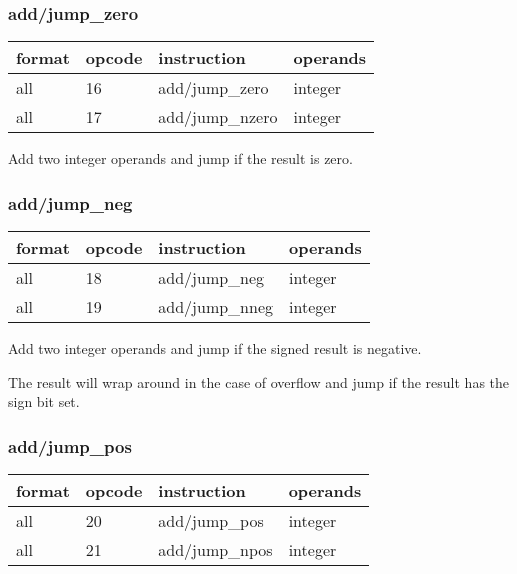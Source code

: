 \documentclass[forwardcom.tex]{subfiles}
\begin{document}
\subsubsection{add/jump\_zero}
\label{table:addJumpZeroInstruction}
\begin{tabular}{|p{16mm}|p{12mm}|p{60mm}|p{50mm}|}
\hline
\bfseries format & \bfseries opcode & \bfseries instruction & \bfseries operands \\ \hline
all & 16 & add/jump\_zero & integer \\ \hline
all & 17 & add/jump\_nzero & integer\\ \hline
\end{tabular}
\vspace{2mm}

Add two integer operands and jump if the result is zero.


\subsubsection{add/jump\_neg}
\label{table:addJumpNegInstruction}
\begin{tabular}{|p{16mm}|p{12mm}|p{60mm}|p{50mm}|}
\hline
\bfseries format & \bfseries opcode & \bfseries instruction & \bfseries operands \\ \hline
all & 18 & add/jump\_neg & integer \\ \hline
all & 19 & add/jump\_nneg & integer\\ \hline
\end{tabular}
\vspace{2mm}

Add two integer operands and jump if the signed result is negative.

The result will wrap around in the case of overflow and jump if the result has the sign bit set.


\subsubsection{add/jump\_pos}
\label{table:addJumpPosInstruction}
\begin{tabular}{|p{16mm}|p{12mm}|p{60mm}|p{50mm}|}
\hline
\bfseries format & \bfseries opcode & \bfseries instruction & \bfseries operands \\ \hline
all & 20 & add/jump\_pos & integer \\ \hline
all & 21 & add/jump\_npos & integer\\ \hline
\end{tabular}
\vspace{2mm}
\end{document}

